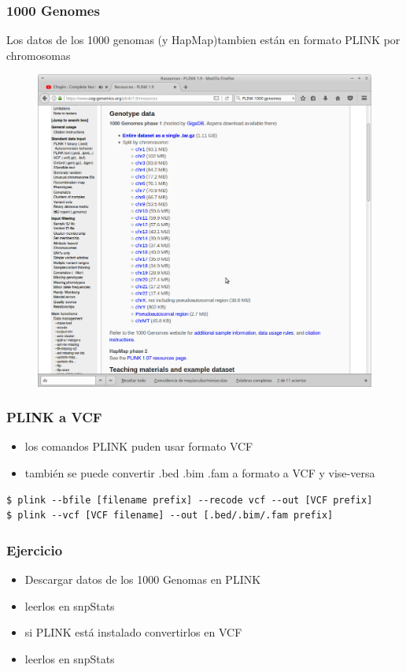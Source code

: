 \documentclass{beamer}\usepackage[]{graphicx}\usepackage[]{color}
\begin{document}
\begin{frame}[fragile]
\frametitle{1000 Genomes}
Los datos de los 1000 genomas (y HapMap)tambien est\'an en formato PLINK por chromosomas
\begin{figure}[htbp]
\begin{center}
\includegraphics[width=.7\linewidth]{plink1kgenomes.png}
\end{center}
\end{figure}

\end{frame}


\begin{frame}[fragile]
\frametitle{PLINK a VCF}
\begin{itemize}
\item los comandos PLINK puden usar formato VCF
\item tambi\'en se puede convertir .bed .bim .fam a formato a VCF y vise-versa
\end{itemize}

{\scriptsize
\begin{verbatim}
$ plink --bfile [filename prefix] --recode vcf --out [VCF prefix]
$ plink --vcf [VCF filename] --out [.bed/.bim/.fam prefix]
\end{verbatim}
}

\end{frame}

\begin{frame}[fragile]
\frametitle{Ejercicio}
\begin{itemize}
\item Descargar datos de los 1000 Genomas en PLINK 
\item leerlos en snpStats
\item si PLINK est\'a instalado convertirlos en VCF
\item leerlos en snpStats
\end{itemize}
\end{frame}
\end{document}
